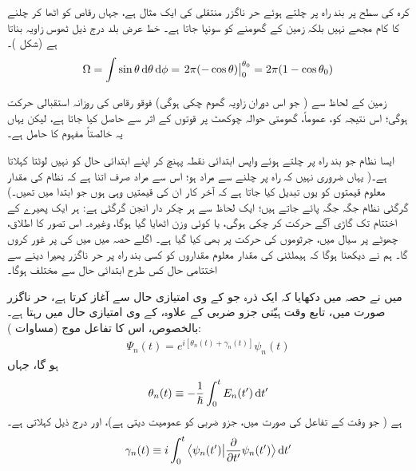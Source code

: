  کرہ کی سطح پر  بند راہ پر چلتے ہوئے حر ناگزر منتقلی کی ایک مثال     ہے،  جہاں  رقاص  کو اٹھا کر چلنے کا کام مجھے نہیں  بلکہ زمین کے گھومنے کو  سونپا جاتا ہے۔  خط عرض بلد  درج ذیل ٹھوس زاویہ بناتا ہے  (شکل   )۔ 
\begin{align}\label{مساوات_حر_ٹھوس_زاویہ}
\Omega = \int \sin \theta \dif \theta \dif \phi =\left.  2\pi (- \cos \theta)\right\vert_0^{\theta_0} = 2 \pi (1 - \cos \theta_0)
\end{align}
%



زمین کے لحاظ سے ( جو اس دوران  زاویہ گھوم چکی  ہوگی)  فوقو    رقاص   کی روزانہ استقبالی حرکت   ہوگی؛ اس نتیجہ کو، عموماً،   گھومتی حوالہ چوکھٹ پر    قوتوں کے اثر  سے حاصل کیا جاتا ہے، لیکن یہاں یہ خالصتاً    مفہوم کا حامل ہے۔ 

 ایسا نظام جو بند راہ پر چلتے ہوئے   واپس ابتدائی  نقطہ  پہنچ کر اپنے  ابتدائی حال کو  نہیں لوٹتا    کہلاتا ہے۔(  یہاں ضروری نہیں کہ  راہ پر چلنے سے مراد   ہو؛  اس سے مراد صرف اتنا ہے کہ نظام کی مقدار معلوم قیمتوں کو یوں تبدیل کیا جاتا ہے کہ آخر کار ان کی قیمتیں وہی ہوں جو ابتدا میں تھیں۔)   گرگٹی  نظام  جگہ جگہ پائے جاتے ہیں؛  ایک لحاظ سے ہر چکر دار انجن  گرگٹی  ہے:  ہر ایک پھیرے  کے اختتام تک گاڑی آگے حرکت کر چکی ہوگی،  یا کوئی وزن اٹھایا گیا ہوگا،  وغیرہ۔ اس تصور کا اطلاق،    چھوٹے    پر  سیال میں،  جرثوموں کی حرکت پر بھی کیا گیا ہے۔     اگلے حصہ میں میں     کی   پر غور کروں گا۔ ہم نے دیکھنا ہوگا کہ ہیملٹنی کی  مقدار معلوم مقداروں کو کسی بند راہ پر حر ناگزر پھیرا دینے سے اختتامی حال کس طرح ابتدائی حال سے مختلف ہوگا۔ 


میں نے حصہ    میں دکھایا کہ  ایک ذرہ جو  کے  وی امتیازی حال سے آغاز کرتا ہے،  حر ناگزر صورت  میں، تابع وقت ہیّتی جزو ضربی کے علاوہ،   کے   وی امتیازی حال میں  رہتا ہے۔ بالخصوص،  اس کا تفاعل موج (مساوات  ):
\begin{align}
\Psi_n (t) = e^{i[\theta_n (t) + \gamma_n (t)]} \psi_n (t)
\end{align} 
ہو گا، جہاں 
\begin{align}\label{مساوات_حر_درست_روپ}
\theta_n (t) \equiv - \frac{1}{\hslash} \int_0^t E_n (t') \dif t'
\end{align}
  ہے ( جو وقت کے  تفاعل  کی صورت میں،   جزو ضربی  کو عمومیت دیتی ہے)،   اور درج ذیل  کہلاتی ہے۔
\begin{align}
\gamma_n(t)\equiv i\int_0^t \big\langle \psi_n(t')\big|\frac{\partial}{\partial t'}\psi_n(t')\big \rangle \dif t'
\end{align}

